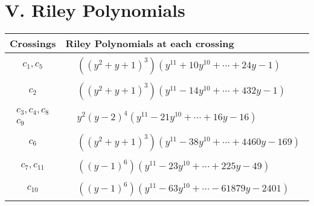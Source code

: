 \documentclass[1p]{elsarticle_modified}
\theoremstyle{definition}
\begin{document}
\centering \section*{ V. Riley Polynomials}
\begin{tabular}{m{50pt}|m{274pt}}
Crossings & \hspace{64pt}Riley Polynomials at each crossing \\
\hline $$\begin{aligned}c_{1},c_{5}\end{aligned}$$&$\begin{aligned}
&((y^2+y+1)^3)(y^{11}+10 y^{10}+\cdots+24 y-1)
\end{aligned}$\\
\hline $$\begin{aligned}c_{2}\end{aligned}$$&$\begin{aligned}
&((y^2+y+1)^3)(y^{11}-14 y^{10}+\cdots+432 y-1)
\end{aligned}$\\
\hline $$\begin{aligned}c_{3},c_{4},c_{8}\\c_{9}\end{aligned}$$&$\begin{aligned}
&y^2(y-2)^4(y^{11}-21 y^{10}+\cdots+16 y-16)
\end{aligned}$\\
\hline $$\begin{aligned}c_{6}\end{aligned}$$&$\begin{aligned}
&((y^2+y+1)^3)(y^{11}-38 y^{10}+\cdots+4460 y-169)
\end{aligned}$\\
\hline $$\begin{aligned}c_{7},c_{11}\end{aligned}$$&$\begin{aligned}
&((y-1)^6)(y^{11}-23 y^{10}+\cdots+225 y-49)
\end{aligned}$\\
\hline $$\begin{aligned}c_{10}\end{aligned}$$&$\begin{aligned}
&((y-1)^6)(y^{11}-63 y^{10}+\cdots-61879 y-2401)
\end{aligned}$\\
\hline
\end{tabular}
\vskip 2pc
\end{document}
